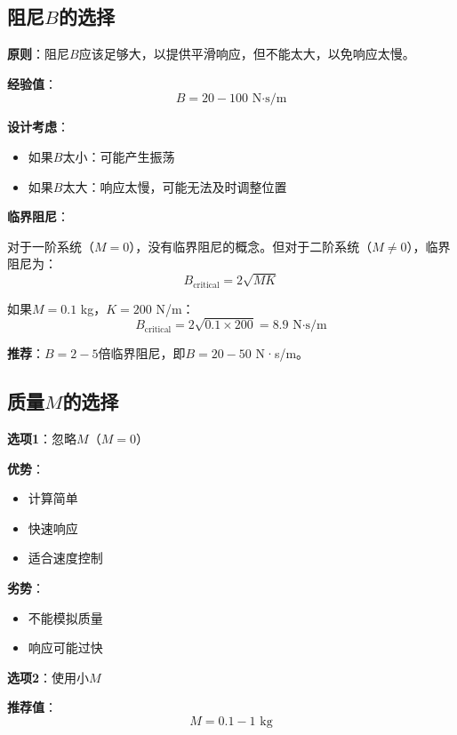 \documentclass[12pt,a4paper]{article}
\begin{document}
\subsection{阻尼$B$的选择}

\textbf{原则}：阻尼$B$应该足够大，以提供平滑响应，但不能太大，以免响应太慢。

\textbf{经验值}：
\begin{equation}
B = 20-100 \text{ N·s/m}
\end{equation}

\textbf{设计考虑}：
\begin{itemize}
\item 如果$B$太小：可能产生振荡
\item 如果$B$太大：响应太慢，可能无法及时调整位置
\end{itemize}

\textbf{临界阻尼}：

对于一阶系统（$M = 0$），没有临界阻尼的概念。但对于二阶系统（$M \neq 0$），临界阻尼为：
\begin{equation}
B_{\text{critical}} = 2\sqrt{MK}
\end{equation}

如果$M = 0.1$ kg，$K = 200$ N/m：
\begin{equation}
B_{\text{critical}} = 2\sqrt{0.1 \times 200} = 8.9 \text{ N·s/m}
\end{equation}

\textbf{推荐}：$B = 2-5$倍临界阻尼，即$B = 20-50$ N·s/m。

\subsection{质量$M$的选择}

\textbf{选项1}：忽略$M$（$M = 0$）

\textbf{优势}：
\begin{itemize}
\item 计算简单
\item 快速响应
\item 适合速度控制
\end{itemize}

\textbf{劣势}：
\begin{itemize}
\item 不能模拟质量
\item 响应可能过快
\end{itemize}

\textbf{选项2}：使用小$M$

\textbf{推荐值}：
\begin{equation}
M = 0.1-1 \text{ kg}
\end{equation}
\end{document}
